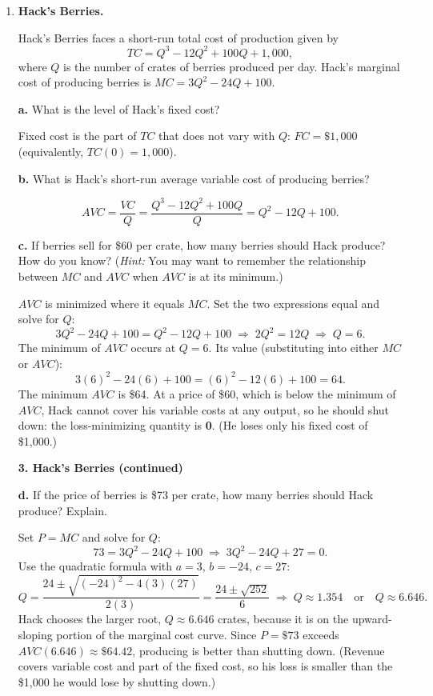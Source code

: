 \documentclass[11pt,a4paper]{article}
\newif\ifsolutions
\newcommand{\ans}[1]{\ifsolutions\else\par\vspace{0pt plus #1fill}\fi}
\newcommand{\continuepage}[1]{%
  \ifsolutions\par\else
  \newpage\pagestyle{plain}\thispagestyle{plain}
  \noindent\textbf{#1 (continued)}\par\medskip
  \fi}
\newcommand{\problempage}{%
  \ifsolutions\par\needspace{10\baselineskip}\bigskip
  \else\newpage\pagestyle{plain}\thispagestyle{plain}\fi}
\begin{document}
\begin{enumerate}
\problempage
\item \textbf{Hack's Berries.}

Hack's Berries faces a short-run total cost of production given by
\[
TC = Q^3 - 12Q^2 + 100Q + 1{,}000,
\]
where $Q$ is the number of crates of berries produced per day. Hack's marginal cost of producing berries is $MC = 3Q^2 - 24Q + 100$.

\noindent\textbf{a.} What is the level of Hack's fixed cost?
\ans{1}

\begin{solution}
Fixed cost is the part of $TC$ that does not vary with $Q$: $FC = \$1{,}000$ (equivalently, $TC(0) = 1{,}000$).
\end{solution}

\noindent\textbf{b.} What is Hack's short-run average variable cost of producing berries?
\ans{1.3}

\begin{solution}
\[
AVC = \frac{VC}{Q} = \frac{Q^3 - 12Q^2 + 100Q}{Q} = Q^2 - 12Q + 100.
\]
\end{solution}

\noindent\textbf{c.} If berries sell for \$60 per crate, how many berries should Hack produce? How do you know? (\emph{Hint:} You may want to remember the relationship between $MC$ and $AVC$ when $AVC$ is at its minimum.)
\ans{3}

\begin{solution}
$AVC$ is minimized where it equals $MC$. Set the two expressions equal and solve for $Q$:
\[
3Q^2 - 24Q + 100 = Q^2 - 12Q + 100
\;\Longrightarrow\;
2Q^2 = 12Q
\;\Longrightarrow\;
Q = 6.
\]
The minimum of $AVC$ occurs at $Q = 6$. Its value (substituting into either $MC$ or $AVC$):
\[
3(6)^2 - 24(6) + 100 = (6)^2 - 12(6) + 100 = 64.
\]
The minimum $AVC$ is \$64. At a price of \$60, which is below the minimum of $AVC$, Hack cannot cover his variable costs at any output, so he should shut down: the loss-minimizing quantity is \textbf{0}. (He loses only his fixed cost of \$1,000.)
\end{solution}

\continuepage{3. Hack's Berries}

\noindent\textbf{d.} If the price of berries is \$73 per crate, how many berries should Hack produce? Explain.
\ans{1}

\begin{solution}
Set $P = MC$ and solve for $Q$:
\[
73 = 3Q^2 - 24Q + 100
\;\Longrightarrow\;
3Q^2 - 24Q + 27 = 0.
\]
Use the quadratic formula with $a = 3$, $b = -24$, $c = 27$:
\[
Q = \frac{24 \pm \sqrt{(-24)^2 - 4(3)(27)}}{2(3)} = \frac{24 \pm \sqrt{252}}{6}
\;\Longrightarrow\;
Q \approx 1.354 \quad\text{or}\quad Q \approx 6.646.
\]
Hack chooses the larger root, $Q \approx \mathbf{6.646}$ crates, because it is on the upward-sloping portion of the marginal cost curve. Since $P = \$73$ exceeds $AVC(6.646) \approx \$64.42$, producing is better than shutting down. (Revenue covers variable cost and part of the fixed cost, so his loss is smaller than the \$1,000 he would lose by shutting down.)
\end{solution}


\end{enumerate}
\end{document}
